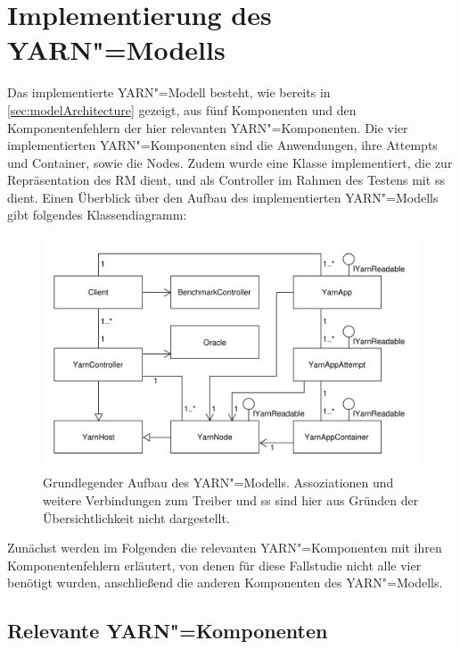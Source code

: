 \section{Implementierung des \acs{YARN}"=Modells}
\label{sec:yarnModel}

Das implementierte \ac{YARN}"=Modell besteht, wie bereits in \cref{sec:modelArchitecture} gezeigt, aus fünf Komponenten und den Komponentenfehlern der hier relevanten \ac{YARN}"=Komponenten.
Die vier implementierten \ac{YARN}"=Komponenten sind die Anwendungen, ihre Attempts und Container, sowie die Nodes.
Zudem wurde eine Klasse implementiert, die zur Repräsentation des \ac{RM} dient, und als Controller im Rahmen des Testens mit \ac{ss} dient.
Einen Überblick über den Aufbau des implementierten \ac{YARN}"=Modells gibt folgendes Klassendiagramm:

\begin{figure}[h]
    \includegraphics{./images/yarnModel_ls_MA.pdf}
    \caption[Grundlegender Aufbau des \acs{YARN}"=Modells]
        {Grundlegender Aufbau des \acs{YARN}"=Modells.
        Assoziationen und weitere Verbindungen zum Treiber und \acs{ss} sind hier aus Gründen der Übersichtlichkeit nicht dargestellt.}
    \label{fig:yarnModelClassDiagram}
\end{figure}

Zunächst werden im Folgenden die relevanten \ac{YARN}"=Komponenten mit ihren Komponentenfehlern erläutert, von denen für diese Fallstudie nicht alle vier benötigt wurden, anschließend die anderen Komponenten des \ac{YARN}"=Modells.

\subsection{Relevante \acs{YARN}"=Komponenten}
\label{sec:yarnComponents}

